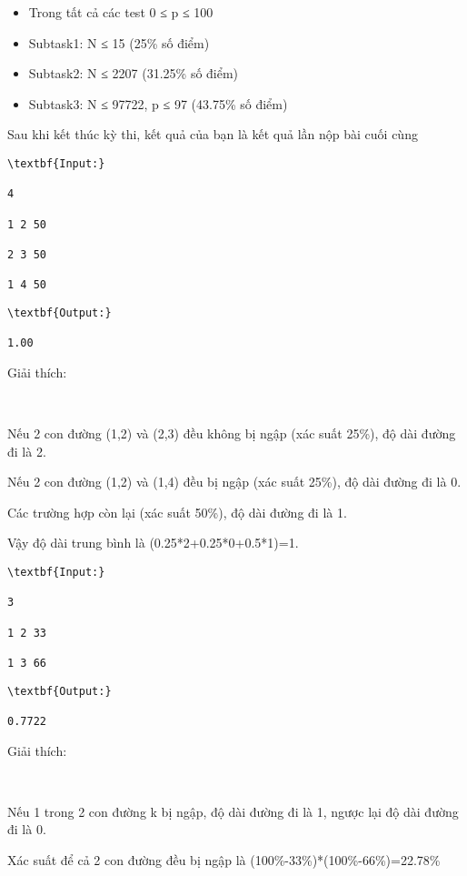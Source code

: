 \begin{itemize}
	\item Trong tất cả các test 0 ≤ p ≤ 100
	\item Subtask1: N ≤ 15 (25\% số điểm)
	\item Subtask2: N ≤ 2207 (31.25\% số điểm)
	\item Subtask3: N ≤ 97722, p ≤ 97 (43.75\% số điểm)
\end{itemize}

Sau khi kết thúc kỳ thi, kết quả của bạn là kết quả lần nộp bài cuối cùng
\begin{verbatim}
\textbf{Input:}

4

1 2 50

2 3 50

1 4 50\end{verbatim}
\begin{verbatim}
\textbf{Output:}

1.00\end{verbatim}

Giải thích:

 

Nếu 2 con đường (1,2) và (2,3) đều không bị ngập (xác suất 25\%), độ dài đường đi là 2.

Nếu 2 con đường (1,2) và (1,4) đều bị ngập (xác suất 25\%), độ dài đường đi là 0.

Các trường hợp còn lại (xác suất 50\%), độ dài đường đi là 1.

Vậy độ dài trung bình là (0.25*2+0.25*0+0.5*1)=1.
\begin{verbatim}
\textbf{Input:}

3

1 2 33

1 3 66\end{verbatim}
\begin{verbatim}
\textbf{Output:}

0.7722\end{verbatim}

Giải thích:

 

Nếu 1 trong 2 con đường k bị ngập, độ dài đường đi là 1, ngược lại độ dài đường đi là 0.

Xác suất để cả 2 con đường đều bị ngập là (100\%-33\%)*(100\%-66\%)=22.78\%